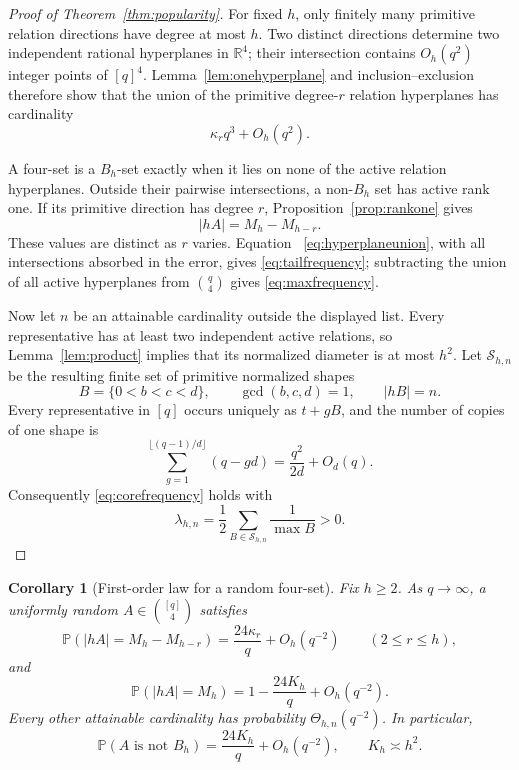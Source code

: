 \documentclass[11pt,reqno]{amsart}
\newtheorem{corollary}[theorem]{Corollary}
\theoremstyle{definition}
\theoremstyle{remark}
\begin{document}
\begin{proof}[Proof of Theorem~\ref{thm:popularity}]
For fixed $h$, only finitely many primitive relation directions have degree
at most $h$.  Two distinct directions determine two independent rational
hyperplanes in $\mathbb R^4$; their intersection contains $O_h(q^2)$
integer points of $[q]^4$.  Lemma~\ref{lem:onehyperplane} and
inclusion--exclusion therefore show that the union of the primitive
degree-$r$ relation hyperplanes has cardinality
\begin{equation}\label{eq:hyperplaneunion}
 \kappa_rq^3+O_h(q^2).
\end{equation}

A four-set is a $B_h$-set exactly when it lies on none of the active
relation hyperplanes.  Outside their pairwise intersections, a non-$B_h$
set has active rank one.  If its primitive direction has degree $r$,
Proposition~\ref{prop:rankone} gives
\[
 |hA|=M_h-M_{h-r}.
\]
These values are distinct as $r$ varies.  Equation~
\eqref{eq:hyperplaneunion}, with all intersections absorbed in the error,
gives \eqref{eq:tailfrequency}; subtracting the union of all active
hyperplanes from $\binom q4$ gives \eqref{eq:maxfrequency}.

Now let $n$ be an attainable cardinality outside the displayed list.  Every
representative has at least two independent active relations, so
Lemma~\ref{lem:product} implies that its normalized diameter is at most
$h^2$.  Let $\mathcal S_{h,n}$ be the resulting finite set of primitive
normalized shapes
\[
 B=\{0<b<c<d\},\qquad \gcd(b,c,d)=1,\qquad |hB|=n.
\]
Every representative in $[q]$ occurs uniquely as $t+gB$, and the number of
copies of one shape is
\[
 \sum_{g=1}^{\lfloor(q-1)/d\rfloor}(q-gd)
 =\frac{q^2}{2d}+O_d(q).
\]
Consequently \eqref{eq:corefrequency} holds with
\begin{equation}\label{eq:lambdaformula}
 \boxed{\ \lambda_{h,n}=\frac12
 \sum_{B\in\mathcal S_{h,n}}\frac1{\max B}>0.\ }
\end{equation}
\end{proof}

\begin{corollary}[First-order law for a random four-set]
\label{cor:random-four-set-first-order}
Fix $h\geq2$.  As $q\to\infty$, a uniformly random
$A\in\binom{[q]}4$ satisfies
\[
 \mathbb P(|hA|=M_h-M_{h-r})
 =\frac{24\kappa_r}{q}+O_h(q^{-2})
 \qquad(2\leq r\leq h),
\]
and
\[
 \mathbb P(|hA|=M_h)
 =1-\frac{24K_h}{q}+O_h(q^{-2}).
\]
Every other attainable cardinality has probability
$\Theta_{h,n}(q^{-2})$.  In particular,
\[
 \mathbb P(A\text{ is not }B_h)
 =\frac{24K_h}{q}+O_h(q^{-2}),
 \qquad K_h\asymp h^2.
\]
\end{corollary}
\end{document}
